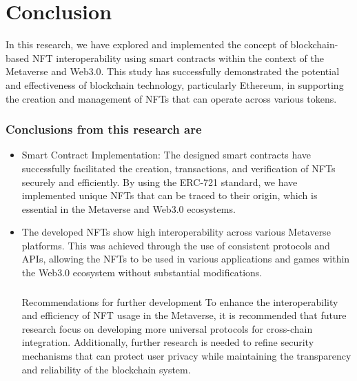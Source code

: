 \section{Conclusion}
\label{sec:kesimpulan}

In this research, we have explored and implemented the concept of blockchain-based NFT interoperability using smart contracts within the context of the Metaverse and Web3.0. This study has successfully demonstrated the potential and effectiveness of blockchain technology, particularly Ethereum, in supporting the creation and management of NFTs that can operate across various tokens.
\subsubsection{Conclusions from this research are}
\begin{itemize}
    \item Smart Contract Implementation: The designed smart contracts have successfully facilitated the creation, transactions, and verification of NFTs securely and efficiently. By using the ERC-721 standard, we have implemented unique NFTs that can be traced to their origin, which is essential in the Metaverse and Web3.0 ecosystems.
    \item The developed NFTs show high interoperability across various Metaverse platforms. This was achieved through the use of consistent protocols and APIs, allowing the NFTs to be used in various applications and games within the Web3.0 ecosystem without substantial modifications.

\subsubsection{}{Recommendations for further development}
To enhance the interoperability and efficiency of NFT usage in the Metaverse, it is recommended that future research focus on developing more universal protocols for cross-chain integration. Additionally, further research is needed to refine security mechanisms that can protect user privacy while maintaining the transparency and reliability of the blockchain system.
\end{itemize} 


